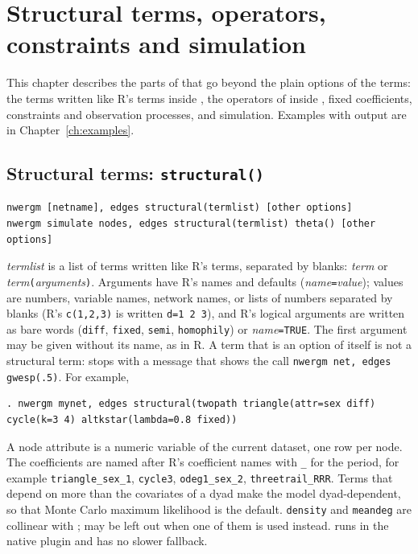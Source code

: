 \chapter{Structural terms, operators, constraints and simulation}\label{ch:special}

This chapter describes the parts of \nwergm{} that go beyond the plain options of the terms: the terms written like R's terms inside , the operators of \ergm{} inside , fixed coefficients, constraints and observation processes, and simulation. Examples with output are in Chapter~\ref{ch:examples}.

\section{Structural terms: \texttt{structural()}}\label{sec:structural}

\begin{lstlisting}
nwergm [netname], edges structural(termlist) [other options]
nwergm simulate nodes, edges structural(termlist) theta() [other options]
\end{lstlisting}
\emph{termlist} is a list of terms written like R's terms, separated by blanks: \emph{term} or \emph{term}\texttt{(}\emph{arguments}\texttt{)}. Arguments have R's names and defaults (\emph{name}\texttt{=}\emph{value}); values are numbers, variable names, network names, or lists of numbers separated by blanks (R's \texttt{c(1,2,3)} is written \texttt{d=1 2 3}), and R's logical arguments are written as bare words (\texttt{diff}, \texttt{fixed}, \texttt{semi}, \texttt{homophily}) or \emph{name}\texttt{=TRUE}. The first argument may be given without its name, as in R. A term that is an option of \nwergm{} itself is not a structural term:  stops with a message that shows the call \texttt{nwergm net, edges gwesp(.5)}. For example,
\begin{lstlisting}
. nwergm mynet, edges structural(twopath triangle(attr=sex diff) cycle(k=3 4) altkstar(lambda=0.8 fixed))
\end{lstlisting}
A node attribute is a numeric variable of the current dataset, one row per node. The coefficients are named after R's coefficient names with \texttt{\_} for the period, for example \texttt{triangle\_sex\_1}, \texttt{cycle3}, \texttt{odeg1\_sex\_2}, \texttt{threetrail\_RRR}. Terms that depend on more than the covariates of a dyad make the model dyad-dependent, so that Monte Carlo maximum likelihood is the default. \texttt{density} and \texttt{meandeg} are collinear with ;  may be left out when one of them is used instead.  runs in the native plugin and has no slower fallback.

